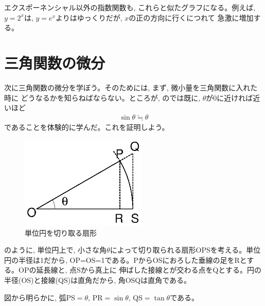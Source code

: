 エクスポーネンシャル以外の指数関数も, これらと似たグラフになる。例えば, 
$y=2^x$は, $y=e^x$よりはゆっくりだが, $x$の正の方向に行くにつれて
急激に増加する。








\section{三角関数の微分}

次に三角関数の微分を学ぼう。そのためには, まず, 微小量を三角関数に入れた時に
どうなるかを知らねばならない。ところが, のでは既に, 
$\theta$が0に近ければ近いほど 
\begin{eqnarray}
\sin \theta \fallingdotseq \theta\label{eq:theta_sintheta}
\end{eqnarray}
であることを体験的に学んだ。これを証明しよう。
\begin{figure}[h]
    \centering
    \includegraphics[width=6cm]{sinx_x.eps}
    \caption{単位円を切り取る扇形}\label{fig:sinx_x}
\end{figure}

のように, 
単位円上で, 小さな角$\theta$によって切り取られる扇形OPSを考える。単位円の半径は1だから, 
OP=OS=1である。PからOSにおろした垂線の足をRとする。OPの延長線と, 点Sから真上に
伸ばした接線とが交わる点をQとする。円の半径(OS)と接線(QS)は直角だから, 角OSQは直角である。

図から明らかに, 弧PS$=\theta$, PR$=\sin \theta$, QS$=\tan \theta$である。


